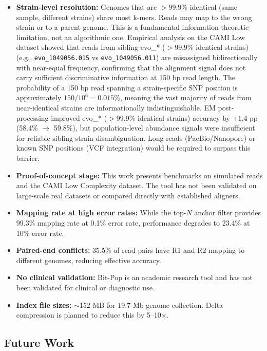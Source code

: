 \documentclass{article}
\begin{document}
\begin{itemize}
\item \textbf{Strain-level resolution:} Genomes that are $>$99.9\% identical (same sample, different strains) share most k-mers. Reads may map to the wrong strain or to a parent genome. This is a fundamental information-theoretic limitation, not an algorithmic one. Empirical analysis on the CAMI Low dataset showed that reads from sibling evo\_* ($>$99.9\% identical strains) (e.g., \texttt{evo\_1049056.015} vs \texttt{evo\_1049056.011}) are misassigned bidirectionally with near-equal frequency, confirming that the alignment signal does not carry sufficient discriminative information at 150 bp read length. The probability of a 150 bp read spanning a strain-specific SNP position is approximately $150/10^6 = 0.015\%$, meaning the vast majority of reads from near-identical strains are informationally indistinguishable. EM post-processing improved evo\_* ($>$99.9\% identical strains) accuracy by +1.4 pp (58.4\% $\to$ 59.8\%), but population-level abundance signals were insufficient for reliable sibling strain disambiguation. Long reads (PacBio/Nanopore) or known SNP positions (VCF integration) would be required to surpass this barrier.
\item \textbf{Proof-of-concept stage:} This work presents benchmarks on simulated reads and the CAMI Low Complexity dataset. The tool has not been validated on large-scale real datasets or compared directly with established aligners.
\item \textbf{Mapping rate at high error rates:} While the top-$N$ anchor filter provides 99.3\% mapping rate at 0.1\% error rate, performance degrades to 23.4\% at 10\% error rate.
\item \textbf{Paired-end conflicts:} 35.5\% of read pairs have R1 and R2 mapping to different genomes, reducing effective accuracy.
\item \textbf{No clinical validation:} Bit-Pop is an academic research tool and has not been validated for clinical or diagnostic use.
\item \textbf{Index file sizes:} $\sim$152 MB for 19.7 Mb genome collection. Delta compression is planned to reduce this by 5--10$\times$.
\end{itemize}

\subsection{Future Work}
\end{document}
